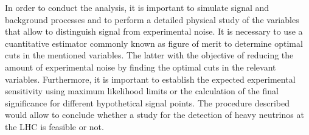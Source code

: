 In order to conduct the analysis, it is important to simulate signal and background processes and to perform a detailed physical study of the variables that allow to distinguish signal from experimental noise. It is necessary to use a cuantitative estimator commonly known as figure of merit to determine optimal cuts in the mentioned variables. The latter with the objective of reducing the amount of experimental noise by finding the optimal cuts in the relevant variables. Furthermore, it is important to establish the expected experimental sensitivity using maximum likelihood limits or the calculation of the final significance for different hypothetical signal points. The procedure described would allow to conclude whether a study for the detection of heavy neutrinos at the LHC is feasible or not.
